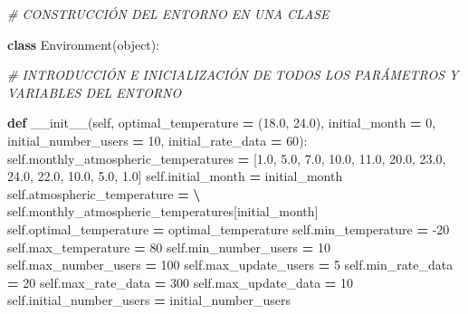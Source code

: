 \documentclass[]{book}
\newenvironment{Shaded}{\begin{snugshade}}{\end{snugshade}}
\newcommand{\BuiltInTok}[1]{#1}
\newcommand{\CommentTok}[1]{\textcolor[rgb]{0.56,0.35,0.01}{\textit{#1}}}
\newcommand{\DecValTok}[1]{\textcolor[rgb]{0.00,0.00,0.81}{#1}}
\newcommand{\FloatTok}[1]{\textcolor[rgb]{0.00,0.00,0.81}{#1}}
\newcommand{\FunctionTok}[1]{\textcolor[rgb]{0.00,0.00,0.00}{#1}}
\newcommand{\KeywordTok}[1]{\textcolor[rgb]{0.13,0.29,0.53}{\textbf{#1}}}
\newcommand{\NormalTok}[1]{#1}
\newcommand{\OperatorTok}[1]{\textcolor[rgb]{0.81,0.36,0.00}{\textbf{#1}}}
\newcommand{\VariableTok}[1]{\textcolor[rgb]{0.00,0.00,0.00}{#1}}
\begin{document}
\begin{Shaded}
\begin{Highlighting}[]
\CommentTok{# CONSTRUCCIÓN DEL ENTORNO EN UNA CLASE}

\KeywordTok{class}\NormalTok{ Environment(}\BuiltInTok{object}\NormalTok{):}
    
    \CommentTok{# INTRODUCCIÓN E INICIALIZACIÓN DE TODOS LOS PARÁMETROS Y VARIABLES DEL ENTORNO}
    
    \KeywordTok{def} \FunctionTok{__init__}\NormalTok{(}\VariableTok{self}\NormalTok{,}
\NormalTok{                optimal_temperature }\OperatorTok{=}\NormalTok{ (}\FloatTok{18.0}\NormalTok{, }\FloatTok{24.0}\NormalTok{),}
\NormalTok{                initial_month }\OperatorTok{=} \DecValTok{0}\NormalTok{,}
\NormalTok{                initial_number_users }\OperatorTok{=} \DecValTok{10}\NormalTok{,}
\NormalTok{                initial_rate_data }\OperatorTok{=} \DecValTok{60}\NormalTok{):}
        \VariableTok{self}\NormalTok{.monthly_atmospheric_temperatures }\OperatorTok{=}\NormalTok{ [}\FloatTok{1.0}\NormalTok{, }\FloatTok{5.0}\NormalTok{, }\FloatTok{7.0}\NormalTok{, }\FloatTok{10.0}\NormalTok{, }\FloatTok{11.0}\NormalTok{, }\FloatTok{20.0}\NormalTok{,}
                                                \FloatTok{23.0}\NormalTok{, }\FloatTok{24.0}\NormalTok{, }\FloatTok{22.0}\NormalTok{, }\FloatTok{10.0}\NormalTok{, }\FloatTok{5.0}\NormalTok{, }\FloatTok{1.0}\NormalTok{]}
        \VariableTok{self}\NormalTok{.initial_month }\OperatorTok{=}\NormalTok{ initial_month}
        \VariableTok{self}\NormalTok{.atmospheric_temperature }\OperatorTok{=} \OperatorTok{\textbackslash{}}
                                \VariableTok{self}\NormalTok{.monthly_atmospheric_temperatures[initial_month]}
        \VariableTok{self}\NormalTok{.optimal_temperature }\OperatorTok{=}\NormalTok{ optimal_temperature}
        \VariableTok{self}\NormalTok{.min_temperature }\OperatorTok{=} \DecValTok{-20}
        \VariableTok{self}\NormalTok{.max_temperature }\OperatorTok{=} \DecValTok{80}
        \VariableTok{self}\NormalTok{.min_number_users }\OperatorTok{=} \DecValTok{10}
        \VariableTok{self}\NormalTok{.max_number_users }\OperatorTok{=} \DecValTok{100}
        \VariableTok{self}\NormalTok{.max_update_users }\OperatorTok{=} \DecValTok{5}
        \VariableTok{self}\NormalTok{.min_rate_data }\OperatorTok{=} \DecValTok{20}
        \VariableTok{self}\NormalTok{.max_rate_data }\OperatorTok{=} \DecValTok{300}
        \VariableTok{self}\NormalTok{.max_update_data }\OperatorTok{=} \DecValTok{10}
        \VariableTok{self}\NormalTok{.initial_number_users }\OperatorTok{=}\NormalTok{ initial_number_users}

\end{Highlighting}
\end{Shaded}
\end{document}
